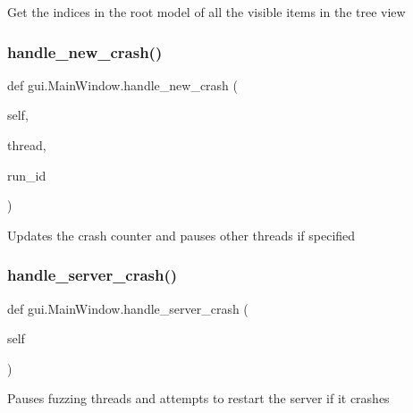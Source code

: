 \begin{DoxyVerb}Get the indices in the root model of all the visible items in the tree view \end{DoxyVerb}
 \mbox{\label{classgui_1_1_main_window_adc3e172325a2ce27f5e1068681690407}} 
\subsubsection{\texorpdfstring{handle\+\_\+new\+\_\+crash()}{handle\_new\_crash()}}
{\footnotesize\ttfamily def gui.\+Main\+Window.\+handle\+\_\+new\+\_\+crash (\begin{DoxyParamCaption}\item[{}]{self,  }\item[{}]{thread,  }\item[{}]{run\+\_\+id }\end{DoxyParamCaption})}

\begin{DoxyVerb}Updates the crash counter and pauses other threads if specified \end{DoxyVerb}
 \mbox{\label{classgui_1_1_main_window_a6ef7486d243e2ae8fa115a5f6ea6ee40}} 
\subsubsection{\texorpdfstring{handle\+\_\+server\+\_\+crash()}{handle\_server\_crash()}}
{\footnotesize\ttfamily def gui.\+Main\+Window.\+handle\+\_\+server\+\_\+crash (\begin{DoxyParamCaption}\item[{}]{self }\end{DoxyParamCaption})}

\begin{DoxyVerb}Pauses fuzzing threads and attempts to restart the server if it crashes \end{DoxyVerb}
 \mbox{\label{classgui_1_1_main_window_a09e1320955909d0a987d7846fa81107f}} 
